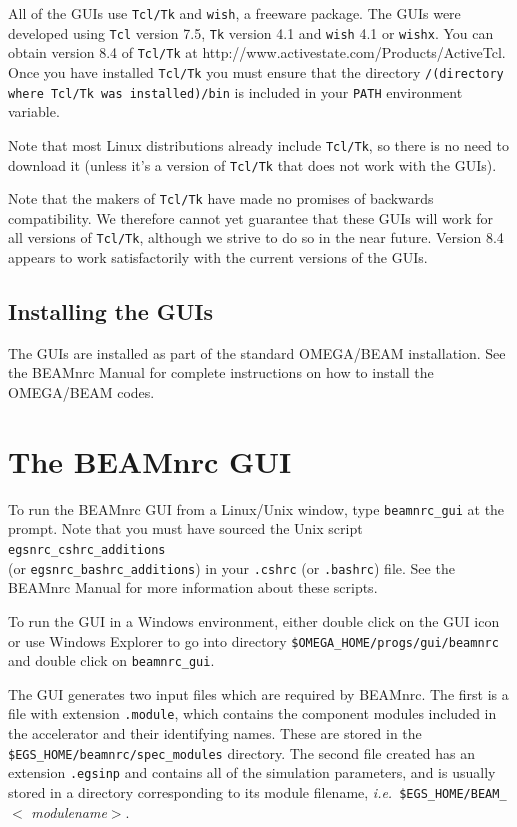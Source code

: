 \documentclass[12pt,twoside]{article}
\newcommand{\ie}{{\em i.e.}}
\begin{document}
All of the GUIs use {\tt Tcl/Tk} and {\tt wish}, a freeware package.
The GUIs were developed using {\tt Tcl} version 7.5, {\tt Tk} version
4.1 and {\tt wish} 4.1 or {\tt wishx}.  You
can obtain version 8.4 of {\tt Tcl/Tk} at
{http://www.activestate.com/Products/ActiveTcl}.
Once you have installed {\tt Tcl/Tk} you must ensure that the directory
{\tt /(directory where Tcl/Tk was installed)/bin} is included in your
{\tt PATH} environment variable.

Note that most Linux distributions already include {\tt Tcl/Tk}, so there
is no need to download it (unless it's a version of {\tt Tcl/Tk}
that does not work with the GUIs).

Note that the makers of {\tt Tcl/Tk} have made no promises of backwards
compatibility.  We therefore cannot yet guarantee that these GUIs will
work for all versions of {\tt Tcl/Tk}, although we strive to do so in
the near future.  Version 8.4 appears to work satisfactorily with the
current versions of the GUIs.

\subsection{Installing the GUIs}

The GUIs are installed as part of the standard OMEGA/BEAM installation.
See the BEAMnrc Manual\cite{Ro04a} for complete instructions on how to
install the OMEGA/BEAM codes.

\section{The BEAMnrc GUI}

To run the BEAMnrc GUI from a Linux/Unix window, type {\tt beamnrc\_gui} at
the prompt.  Note that you must have sourced the Unix script
{\tt egsnrc\_cshrc\_additions}\\(or {\tt egsnrc\_bashrc\_additions}) in
your {\tt .cshrc} (or {\tt .bashrc}) file.  See the BEAMnrc Manual\cite{Ro04a}
for more information about these scripts.

To run the GUI in a Windows environment, either double click on
the GUI icon or use Windows Explorer to go into directory
{\tt \$OMEGA\_HOME/progs/gui/beamnrc} and double click on
{\tt beamnrc\_gui}.

The GUI generates two input files which are required by BEAMnrc.  The first is a
file with extension {\tt .module}, which contains the component modules
included in the accelerator and their identifying names.  These are
stored in the {\tt \$EGS\_HOME/beamnrc/spec\_modules} directory.  The
second file created has an extension {\tt .egsinp} and contains all of the
simulation parameters, and is usually stored in a directory
corresponding to its module filename, \ie~{\tt \$EGS\_HOME/BEAM\_}$<${\em
modulename}$>$.
\end{document}
